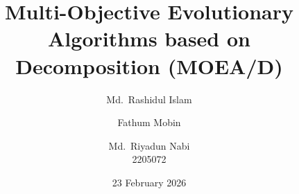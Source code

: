 \documentclass[aspectratio=169]{beamer}
\title[MOEA/D]{Multi-Objective Evolutionary Algorithms based on Decomposition (MOEA/D)}
\author[Rashidul, Mobin, Riyad]{Md.\ Rashidul Islam \and Fathum Mobin \and Md.\ Riyadun Nabi \\ 2205072 \qquad \qquad 2205073 \qquad \qquad 2205076}
\date[February 2026]{23 February 2026}
\begin{document}

\begin{frame}
  \titlepage
\end{frame}












\end{document}

